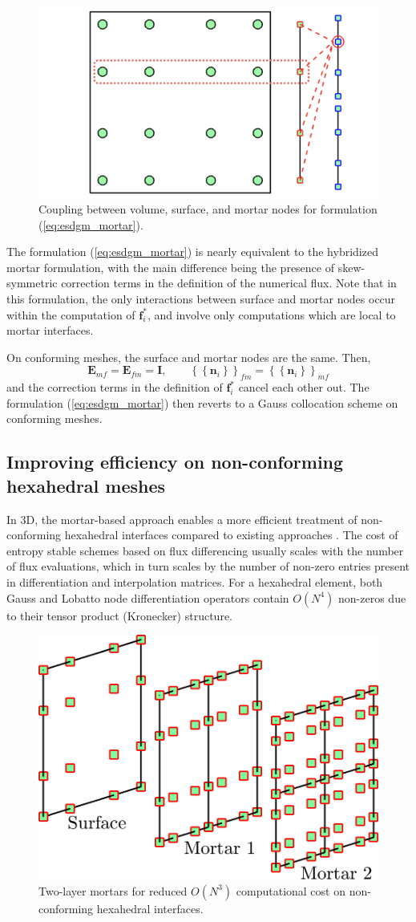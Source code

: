 \documentclass{svjour3}                     %
\newcommand{\LRc}[1]{\left\{ #1 \right\}}
\newcommand{\avg}[1] {\ensuremath{\LRc{\!\LRc{#1}\!}}}
\begin{document}
\begin{figure}
\centering
\includegraphics[width=.55\textwidth]{mortar_coupling.png}
\caption{Coupling between volume, surface, and mortar nodes for formulation (\ref{eq:esdgm_mortar}).}
\end{figure}
The formulation (\ref{eq:esdgm_mortar}) is nearly equivalent to the hybridized mortar formulation, with the main difference being the presence of skew-symmetric correction terms in the definition of the numerical flux.  Note that in this formulation, the only interactions between surface and mortar nodes occur within the computation of $\bm{f}^*_i$, and involve only computations which are local to mortar interfaces.  
\begin{remark}
On conforming meshes, the surface and mortar nodes are the same.  Then,  
\[
\bm{E}_{mf} = \bm{E}_{fm} = \bm{I}, \qquad \avg{\bm{n}_i}_{fm} = \avg{\bm{n}_i}_{mf}
\]
and the correction terms in the definition of $\bm{f}^*_i$ cancel each other out.  The formulation (\ref{eq:esdgm_mortar}) then reverts to a Gauss collocation scheme \cite{chan2017discretely} on conforming meshes.  
\end{remark}


\subsection{Improving efficiency on non-conforming hexahedral meshes}
\label{sec:anisotropic}

In 3D, the mortar-based approach enables a more efficient treatment of non-conforming hexahedral interfaces compared to existing approaches \cite{friedrich2017entropy}.  The cost of entropy stable schemes based on flux differencing usually scales with the number of flux evaluations, which in turn scales by the number of non-zero entries present in differentiation and interpolation matrices.  For a hexahedral element, both Gauss and Lobatto node differentiation operators contain $O(N^4)$ non-zeros due to their tensor product (Kronecker) structure.  

\begin{figure}[!h]
\centering
\includegraphics[width=.5\textwidth]{noncon3D.png}
\caption{Two-layer mortars for reduced $O(N^3)$ computational cost on non-conforming hexahedral interfaces.}
\label{fig:aniso}
\end{figure}
\end{document}
